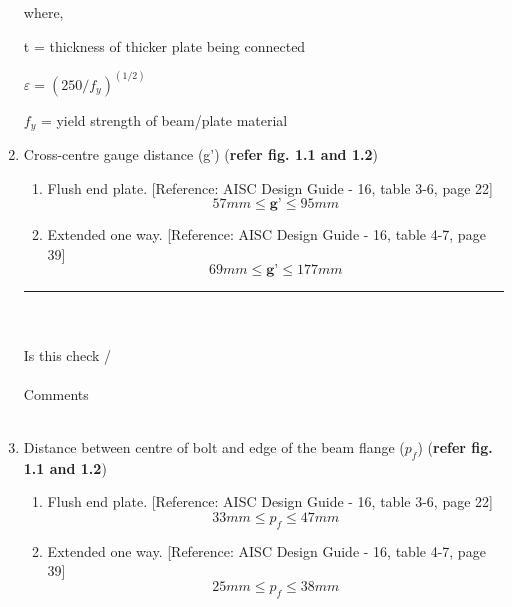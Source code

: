 \documentclass[11.5pt,a4paper,oneside]{report}
\newcommand{\okornot}{ \vspace{15mm} \hrule
	\noindent \\ \\
	Is this check \qquad
	\CheckBox[checked=False, name= ok]{\textbf{Ok}} \qquad / 
	\CheckBox[checked=False, name= notok]{\textbf{Not Ok}}\\ \\
	Comments \\ \\
	\noindent
	\TextField[name=multilinetextbox, multiline=true, width=1.0\linewidth,height=2in]{}}
\begin{document}
\begin{Form}
\begin{enumerate}
				\hspace{10mm}
				where,
				
				\hspace{30mm}
				t = thickness of thicker plate being connected
				
				\hspace{30mm}
				$\varepsilon = (250 / f_{y}) ^ {(1/2)}$ 
				
				\hspace{30mm}
				$f_{y}$ = yield strength of beam/plate material 				 
			
			\vspace{2mm}
				
				\item \large {Cross-centre gauge distance (g')} (\textbf{refer fig. 1.1 and 1.2}) \\
					\begin{enumerate}
						\item Flush end plate. [Reference: AISC Design Guide - 16, table 3-6, page 22]
						\begin{equation}
						\boxed{ 57 mm \leq \textbf{g'} \leq 95 mm }
						\end{equation}
						
						\item Extended one way. [Reference: AISC Design Guide - 16, table 4-7, page 39]
						\begin{equation}
						\boxed{ 69 mm \leq \textbf{g'} \leq 177 mm }
						\end{equation}
					\end{enumerate}
					
				
			\vspace{5mm}
\okornot
				
			\vspace{2mm}
			
				\item \large {Distance between centre of bolt and edge of the beam flange ($p_{f}$)} (\textbf{refer fig. 1.1 and 1.2})\\
				
					\begin{enumerate}
						\item Flush end plate. [Reference: AISC Design Guide - 16, table 3-6, page 22]
						\begin{equation}
						\boxed{ 33 mm \leq p_{f} \leq 47 mm }
						\end{equation}
						
						\item Extended one way. [Reference: AISC Design Guide - 16, table 4-7, page 39]
						\begin{equation}
						\boxed{ 25 mm \leq p_{f} \leq 38 mm }
						\end{equation}
					\end{enumerate}
	    


\end{enumerate}
\end{Form}
\end{document}
